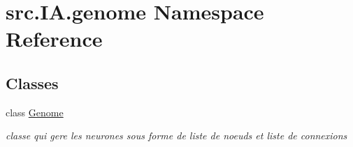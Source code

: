 \hypertarget{namespacesrc_1_1_i_a_1_1genome}{}\section{src.\+I\+A.\+genome Namespace Reference}
\label{namespacesrc_1_1_i_a_1_1genome}
\subsection*{Classes}
\begin{DoxyCompactItemize}
\item 
class \hyperlink{classsrc_1_1_i_a_1_1genome_1_1_genome}{Genome}
\begin{DoxyCompactList}\small\item\em classe qui gere les neurones sous forme de liste de noeuds et liste de connexions \end{DoxyCompactList}\end{DoxyCompactItemize}
